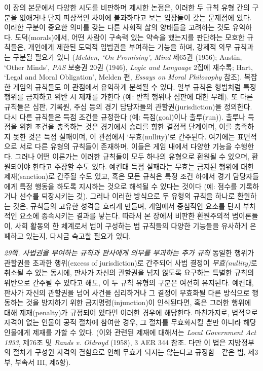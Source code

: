\documentclass[12pt, oneside]{book}  %
\begin{document}
이 장의 본문에서 다양한 시도를 비판하며 제시한 논점은, 이러한 두 규칙
유형 간의 구분을 없애거나 단지 피상적인 차이에 불과하다고 보는 입장들이
갖는 문제점에 있다. 이러한 구분이 중요한 의미를 갖는 다른 사회적 삶의
양태들을 고려하는 것도 유익하다. 도덕(morals)에서, 어떤 사람이 구속력
있는 약속을 했는지를 판단하는 모호한 규칙들은, 개인에게 제한된 도덕적
입법권을 부여하는 기능을 하며, 강제적 의무 규칙과는 구분될 필요가 있다
(\emph{Melden, `On Promising',} \emph{Mind} 제65권 (1956); Austin,
`Other Minds', \emph{PAS} 보충권 20권 (1946), \emph{Logic and Language}
2집에 재수록; Hart, `Legal and Moral Obligation', Melden 편,
\emph{Essays on Moral Philosophy} 참조). 복잡한 게임의 규칙들도 이
관점에서 유익하게 분석될 수 있다. 일부 규칙은 형법처럼 특정 행위를
금지하고 위반 시 제재를 가한다 (예: 반칙 행위나 심판에 대한 무례). 또
다른 규칙들은 심판, 기록원, 주심 등의 경기 담당자들의
관할권(jurisdiction)을 정의한다. 다시 다른 규칙들은 득점 조건을 규정한다
(예: 득점(goal)이나 출루(run)). 출루나 득점을 위한 조건을 충족하는 것은
경기에서 승리를 향한 결정적 단계이며, 이를 충족하지 못한 것은 득점
실패이며, 이 관점에서 `무효(nullity)'로 간주된다. 여기에는 표면적으로
서로 다른 유형의 규칙들이 존재하며, 이들은 게임 내에서 다양한 기능을
수행한다. 그러나 어떤 이론가는 이러한 규칙들이 모두 하나의 유형으로
환원될 수 있으며, 환원되어야 한다고 주장할 수도 있다. 예컨대 득점
실패라는 무효는 금지된 행위에 대한 제재(sanction)로 간주될 수도 있고,
혹은 모든 규칙은 특정 조건 하에서 경기 담당자들에게 특정 행동을 하도록
지시하는 것으로 해석될 수 있다는 것이다 (예: 점수를 기록하거나 선수를
퇴장시키는 것). 그러나 이러한 방식으로 두 유형의 규칙을 하나로 환원하는
것은, 규칙들의 고유한 성격을 흐리게 만들며, 게임에서 중심적인 요소를
단지 부차적인 요소에 종속시키는 결과를 낳는다. 따라서 본 장에서 비판한
환원주의적 법이론들이, 사회 활동의 한 체계로서 법이 구성하는 법 규칙들의
다양한 기능들을 유사하게 은폐하고 있는지, 다시금 숙고할 필요가 있다.

\emph{29쪽. 사법권을 부여하는 규칙과 판사에게 의무를 부과하는 추가 규칙}
동일한 행위가 관할권을 초과한 행위(excess of jurisdiction)로 간주되어
사법 결정이 \emph{무효(nullity)}로 취소될 수 있는 동시에, 판사가 자신의
관할권을 넘지 않도록 요구하는 특별한 규칙의 위반으로 간주될 수 있다고
해도, 이 두 규칙 유형의 구분은 여전히 유지된다. 예컨대, 판사가 자신의
관할권을 넘어 사건을 심리하거나 그 결정이 무효화될 다른 방식으로
행동하는 것을 방지하기 위한 금지명령(injunction)이 인식된다면, 혹은
그러한 행위에 대해 제재(penalty)가 규정되어 있다면 이러한 경우에
해당한다. 마찬가지로, 법적으로 자격이 없는 인물이 공적 절차에 참여한
경우, 그 절차를 무효화시킬 뿐만 아니라 해당 인물에게 제재를 가할 수
있다. (이와 관련된 제재에 대해서는 \emph{Local Government Act 1933},
제76조 및 \emph{Rands v. Oldroyd} (1958), 3 AER 344 참조. 다만 이 법은
지방정부의 절차가 구성원 자격의 결함으로 인해 무효가 되지는 않는다고
규정함---같은 법, 제3부, 부속서 III, 제5항).
\end{document}
